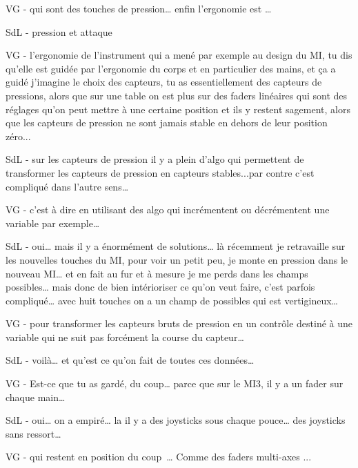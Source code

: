 VG - qui sont des touches de pression… enfin l'ergonomie est … 

SdL - pression et attaque 

VG - l'ergonomie de l'instrument qui a mené par exemple au design du MI, tu dis qu'elle est guidée par l'ergonomie du corps et en particulier des mains, et ça a guidé j'imagine le choix des capteurs, tu as essentiellement des capteurs de pressions, alors que sur une table on est plus sur des faders linéaires qui sont des réglages qu'on peut mettre à une certaine position et ils y restent sagement, alors que les capteurs de pression ne sont jamais stable en dehors de leur position zéro...  

SdL - sur les capteurs de pression il y a plein d'algo qui permettent de transformer les capteurs de pression en capteurs stables...par contre c'est compliqué dans l'autre sens… 

VG - c'est à dire en utilisant des algo qui incrémentent ou décrémentent une variable par exemple… 

SdL - oui… mais il y a énormément de solutions… là récemment je retravaille sur les nouvelles touches du MI, pour voir un petit peu, je monte en pression dans le nouveau MI… et en fait au fur et à mesure je me perds dans les champs possibles…  mais donc de bien intérioriser ce qu'on veut faire, c'est parfois compliqué… avec huit touches on a un champ de possibles qui est vertigineux… 

VG - pour transformer les capteurs bruts de pression en un contrôle destiné à une variable qui ne suit pas forcément la course du capteur… 

SdL - voilà… et qu'est ce qu'on fait de toutes ces données… 

VG - Est-ce que tu as gardé, du coup… parce que sur le MI3, il y a un fader sur chaque main… 

SdL - oui… on a empiré… la il y a des joysticks sous chaque pouce… des joysticks sans ressort… 

VG - qui restent en position du coup … Comme des faders multi-axes ... 

